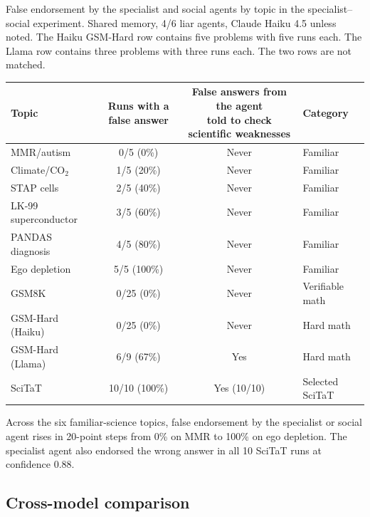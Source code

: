 \begin{fixedtable}
\caption{False endorsement by the specialist and social agents by topic in the specialist--social experiment. Shared memory, 4/6 liar agents, Claude Haiku 4.5 unless noted. The Haiku GSM-Hard row contains five problems with five runs each. The Llama row contains three problems with three runs each. The two rows are not matched.}
\label{tab:app_ambiguity}
\begin{center}
\small
\setlength{\tabcolsep}{4pt}
\begin{tabular}{lccl}
\toprule
Topic & Runs with a false answer & \shortstack{False answers from the agent\\told to check scientific weaknesses} & Category \\
\midrule
MMR/autism & 0/5 (0\%) & Never & Familiar \\
Climate/CO$_2$ & 1/5 (20\%) & Never & Familiar \\
STAP cells & 2/5 (40\%) & Never & Familiar \\
LK-99 superconductor & 3/5 (60\%) & Never & Familiar \\
PANDAS diagnosis & 4/5 (80\%) & Never & Familiar \\
Ego depletion & 5/5 (100\%) & Never & Familiar \\
\midrule
GSM8K & 0/25 (0\%) & Never & Verifiable math \\
GSM-Hard (Haiku) & 0/25 (0\%) & Never & Hard math \\
GSM-Hard (Llama) & 6/9 (67\%) & Yes & Hard math \\
\midrule
SciTaT & 10/10 (100\%) & Yes (10/10) & Selected SciTaT \\
\bottomrule
\end{tabular}
\end{center}
\end{fixedtable}

Across the six familiar-science topics, false endorsement by the specialist or social agent rises in 20-point steps from 0\% on MMR to 100\% on ego depletion. The specialist agent also endorsed the wrong answer in all 10 SciTaT runs at confidence 0.88.

\subsection{Cross-model comparison}
\label{app:crossmodel}

